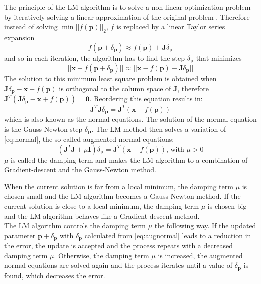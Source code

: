 The principle of the \ac{LM} algorithm is to solve a non-linear optimization problem by iteratively solving a linear approximation of the original problem \cite{Dahmen2013}. Therefore instead of solving $\min ||f(\mathbf{p})||_2$, $f$ is replaced by a linear Taylor series expansion
\begin{equation}
  f(\mathbf{p} + \delta_{\mathbf{p}}) \approx f(\mathbf{p}) + \mathbf{J} \delta_{\mathbf{p}}
\end{equation}
and so in each iteration, the algorithm has to find the step $\delta_{\mathbf{p}}$ that minimizes
\begin{equation}
  || \mathbf{x} - f(\mathbf{p} + \delta_{\mathbf{p}})|| \approx ||\mathbf{x} - f(\mathbf{p}) - \mathbf{J} \delta_{\mathbf{p}}||
\end{equation}
The solution to this minimum least square problem is obtained when $\mathbf{J}\delta_{\mathbf{p}} - \mathbf{x} + f(\mathbf{p})$ is orthogonal to the column space of $\mathbf{J}$, therefore $\mathbf{J}^T(\mathbf{J} \delta_{\mathbf{p}} - \mathbf{x} + f(\mathbf{p})) = \mathbf{0}$. Reordering this equation results in: 
\begin{equation}
  \mathbf{J}^T\mathbf{J}\delta_{\mathbf{p}} = \mathbf{J}^T(\mathbf{x} - f(\mathbf{p}))
  \label{eq:normal}
\end{equation}
which is also known as the normal equations. The solution of the normal equation is the Gauss-Newton step $\delta_{\mathbf{p}}$.
The \ac{LM} method then solves a variation of \autoref{eq:normal}, the so-called augmented normal equations:
\begin{equation}
  (\mathbf{J}^T\mathbf{J} + \mu \mathbf{I})\delta_{\mathbf{p}} = \mathbf{J}^T(\mathbf{x} -f(\mathbf{p})) \text{, with } \mu > 0
  \label{eq:augnormal}
\end{equation}
$\mu$ is called the damping term and makes the \ac{LM} algorithm to a combination of Gradient-descent and the Gauss-Newton method.

When the current solution is far from a local minimum, the damping term $\mu$ is chosen small and the \ac{LM} algorithm becomes a Gauss-Newton method. If the current solution is close to a local minimum, the damping term $\mu$ is chosen big and the \ac{LM} algorithm behaves like a Gradient-descent method.\\

The \ac{LM} algorithm controls the damping term $\mu$ the following way. If the updated parameter $\mathbf{p} + \delta_{\mathbf{p}}$ with $\delta_{\mathbf{p}}$ calculated from \autoref{eq:augnormal} leads to a reduction in the error, the update is accepted and the process repeats with a decreased damping term $\mu$. Otherwise, the damping term $\mu$ is increased, the augmented normal equations are solved again and the process iterates until a value of $\delta_{\mathbf{p}}$ is found, which decreases the error.\\

